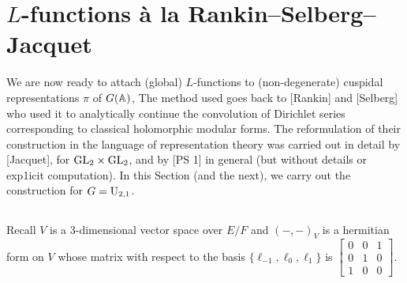 \section{$L$-functions \`a la Rankin--Selberg--Jacquet}
\label{sec:3}


We are now ready to attach (global) $L$-functions to (non-degenerate) cuspidal representations $\pi$ of $G(\mathbb{A})$, The method used goes back to [Rankin] and [Selberg] who used it to analytically continue the convolution of Dirichlet series corresponding to classical holomorphic modular forms.
The reformulation of their construction in the language of representation theory was carried out in detail by [Jacquet], for $\mathrm{GL}_2 \times \mathrm{GL}_2$, and by [PS 1] in general (but without details or exp1icit computation).
In this Section (and the next), we carry out the construction for $G = \mathrm{U}_{2, 1}$.


\subsection{}
\label{sec:3.1}


Recall $V$ is a 3-dimensional vector space over $E/F$ and $(-,-)_V$ is a hermitian form on $V$ whose matrix with respect to the basis $\{\ell_{-1}, \ell_{0}, \ell_{1}\}$ is $\left[\begin{smallmatrix}
    0 & 0 & 1 \\ 0 & 1& 0 \\ 1 & 0 & 0
\end{smallmatrix}\right]$.

